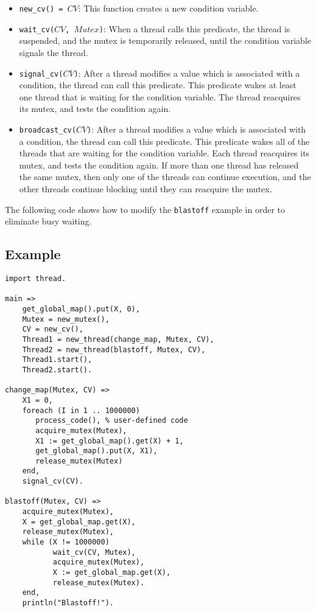 \begin{itemize}
\item \texttt{new\_cv() = $CV$}: This function creates a new condition variable.
\item \texttt{wait\_cv($CV$, $Mutex$)}: When a thread calls this predicate, the thread is suspended, and the mutex is temporarily released, until the condition variable signals the thread.
\item \texttt{signal\_cv($CV$)}: After a thread modifies a value which is associated with a condition, the thread can call this predicate.  This predicate wakes at least one thread that is waiting for the condition variable.  The thread reacquires its mutex, and tests the condition again.
\item \texttt{broadcast\_cv($CV$)}: After a thread modifies a value which is associated with a condition, the thread can call this predicate.  This predicate wakes all of the threads that are waiting for the condition variable.  Each thread reacquires its mutex, and tests the condition again.  If more than one thread has released the same mutex, then only one of the threads can continue execution, and the other threads continue blocking until they can reacquire the mutex.
\end{itemize}

The following code shows how to modify the \texttt{blastoff} example in order to eliminate busy waiting.

\subsection*{Example}
\begin{verbatim}
import thread.

main =>
    get_global_map().put(X, 0),
    Mutex = new_mutex(),
    CV = new_cv(),
    Thread1 = new_thread(change_map, Mutex, CV),
    Thread2 = new_thread(blastoff, Mutex, CV),
    Thread1.start(),
    Thread2.start().

change_map(Mutex, CV) =>
    X1 = 0,
    foreach (I in 1 .. 1000000)
       process_code(), % user-defined code
       acquire_mutex(Mutex),
       X1 := get_global_map().get(X) + 1,
       get_global_map().put(X, X1),
       release_mutex(Mutex) 
    end,
    signal_cv(CV).
    
blastoff(Mutex, CV) =>
    acquire_mutex(Mutex),
    X = get_global_map.get(X),
    release_mutex(Mutex),
    while (X != 1000000)
           wait_cv(CV, Mutex),
           acquire_mutex(Mutex),
           X := get_global_map.get(X),
           release_mutex(Mutex).
    end,
    println("Blastoff!").
\end{verbatim}


